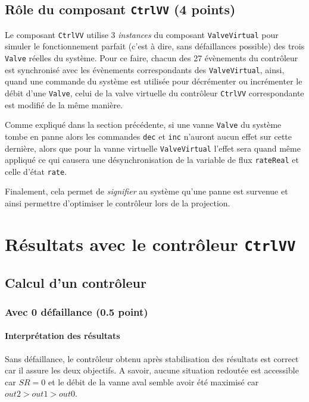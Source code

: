 \documentclass[a4paper]{book}
\begin{document}
\subsection{Rôle du composant {\tt CtrlVV} (4 points)}

Le composant \texttt{CtrlVV} utilise 3 \textit{instances} du composant
\texttt{ValveVirtual} pour simuler le fonctionnement parfait (c'est à dire,
sans défaillances possible) des trois \texttt{Valve} réelles du système. Pour
ce faire, chacun des 27 évènements du contrôleur est synchronisé avec les
évènements correspondants des \texttt{ValveVirtual}, ainsi, quand une commande
du système est utilisée pour décrémenter ou incrémenter le débit d'une
\texttt{Valve}, celui de la valve virtuelle du contrôleur \texttt{CtrlVV}
correspondante est modifié de la même manière.

Comme expliqué dans la section précédente, si une vanne \texttt{Valve} du
système tombe en panne alors les commandes \texttt{dec} et \texttt{inc}
n'auront aucun effet sur cette dernière, alors que pour la vanne virtuelle
\texttt{ValveVirtual} l'effet sera quand même appliqué ce qui causera une
désynchronisation de la variable de flux \texttt{rateReal} et celle d'état
\texttt{rate}.

Finalement, cela permet de \textit{signifier} au système qu'une panne est
survenue et ainsi permettre d'optimiser le contrôleur lors de la projection.

\section{Résultats avec le contrôleur {\tt CtrlVV}}
\subsection{Calcul d'un contrôleur}
\subsubsection{Avec 0 défaillance (0.5 point)}

\paragraph{Interprétation des résultats}

Sans défaillance, le contrôleur obtenu après stabilisation des résultats est
correct car il assure les deux objectifs. A savoir, aucune situation redoutée
est accessible car $SR = 0$ et le débit de la vanne aval semble avoir été
maximisé car $out2 > out1 > out0$.
\end{document}
